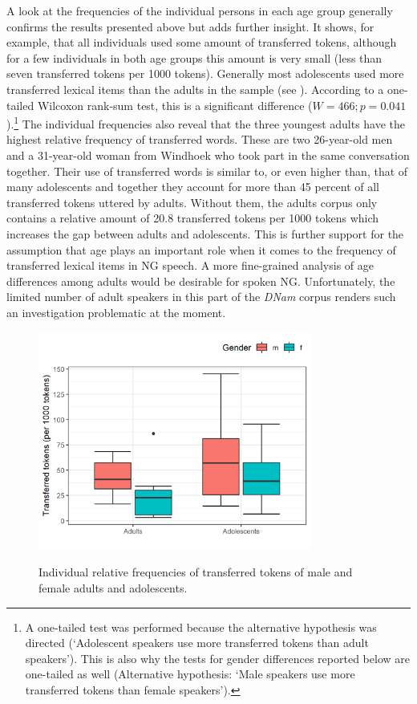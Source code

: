 \documentclass[output=paper]{langsci/langscibook}
\begin{document}
A look at the frequencies of the individual persons in each age group generally confirms the results presented above but adds further insight. It shows, for example, that all individuals used some amount of transferred tokens, although for a few individuals in both age groups this amount is very small (less than seven transferred tokens per 1000 tokens). Generally most adolescents used more transferred lexical items than the adults in the sample (see ). According to a one-tailed Wilcoxon rank-sum test, this is a significant difference ($W = 466; p = 0.041$).\footnote{A one-tailed test was performed because the alternative hypothesis was directed (‘Adolescent speakers use more transferred tokens than adult speakers’). This is also why the tests for gender differences reported below are one-tailed as well (Alternative hypothesis: ‘Male speakers use more transferred tokens than female speakers’).} The individual frequencies also reveal that the three youngest adults have the highest relative frequency of transferred words. These are two 26-year-old men and a 31-year-old woman from Windhoek who took part in the same conversation together. Their use of transferred words is similar to, or even higher than, that of many adolescents and together they account for more than 45 percent of all transferred tokens uttered by adults. Without them, the adults corpus only contains a relative amount of 20.8 transferred tokens per 1000 tokens which increases the gap between adults and adolescents. This is further support for the assumption that age plays an important role when it comes to the frequency of transferred lexical items in NG speech. A more fine-grained analysis of age differences among adults would be desirable for spoken NG. Unfortunately, the limited number of adult speakers in this part of the \textit{DNam} corpus renders such an investigation problematic at the moment.

  
\begin{figure}
\includegraphics[width=0.8\textwidth]{figures/brackefig1.png}
 \label{fig:bracke:1}
\caption{Individual relative frequencies of transferred tokens of male and female adults and adolescents.}
 \end{figure}
\end{document}
